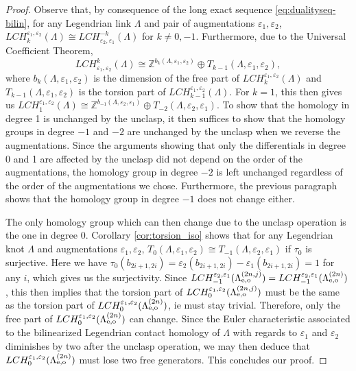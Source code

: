 \documentclass[11pt]{amsart}
\theoremstyle{plain}
\theoremstyle{remark}
\numberwithin{equation}{section}
\newcommand{\Z}{\ensuremath{\mathbb{Z}}}
\begin{document}
\begin{proof}
Observe that, by consequence of the long exact sequence \eqref{eq:dualityseq-bilin}, for any Legendrian link $\Lambda$ and pair of augmentations $\varepsilon_1,\varepsilon_2$, $LCH_k^{\varepsilon_1,\varepsilon_2}(\Lambda)\cong LCH^{-k}_{\varepsilon_2,\varepsilon_1}(\Lambda)$ for $k\neq0,-1$. Furthermore, due to the Universal Coefficient Theorem, $$LCH^{k}_{\varepsilon_1,\varepsilon_2}(\Lambda)\cong \Z^{b_k(\Lambda,\varepsilon_1,\varepsilon_2)}\oplus T_{k-1}(\Lambda,\varepsilon_1,\varepsilon_2),$$ where $b_k(\Lambda,\varepsilon_1,\varepsilon_2)$ is the dimension of the free part of $LCH_{k}^{\varepsilon_1,\varepsilon_2}(\Lambda)$ and $T_{k-1}(\Lambda,\varepsilon_1,\varepsilon_2)$ is the torsion part of $LCH_{k-1}^{\varepsilon_1,\varepsilon_2}(\Lambda)$. For $k=1$, this then gives us $LCH_{1}^{\varepsilon_1,\varepsilon_2}(\Lambda)\cong \Z^{b_{-1}(\Lambda,\varepsilon_2,\varepsilon_1)}\oplus T_{-2}(\Lambda,\varepsilon_2,\varepsilon_1)$. To show that the homology in degree 1 is unchanged by the unclasp, it then suffices to show that the homology groups in degree $-1$ and $-2$ are unchanged by the unclasp when we reverse the augmentations. Since the arguments showing that only the differentials in degree 0 and 1 are affected by the unclasp did not depend on the order of the augmentations, the homology group in degree $-2$ is left unchanged regardless of the order of the augmentations we chose. Furthermore, the previous paragraph shows that the homology group in degree $-1$ does not change either. 

The only homology group which can then change due to the unclasp operation is the one in degree 0. Corollary \ref{cor:torsion_iso} shows that for any Legendrian knot $\Lambda$ and augmentations $\varepsilon_1,\varepsilon_2$, $T_0(\Lambda,\varepsilon_1,\varepsilon_2)\cong T_{-1}(\Lambda,\varepsilon_2,\varepsilon_1)$ if $\tau_0$ is surjective. Here we have $\tau_0(b_{2i+1,2i})=\varepsilon_2(b_{2i+1,2i})-\varepsilon_1(b_{2i+1,2i})=1$ for any $i$, which gives us the surjectivity. Since $LCH^{\varepsilon_2,\varepsilon_1}_{-1}(\Lambda_{\rm e,o}^{(2n,j)})=LCH^{\varepsilon_2,\varepsilon_1}_{-1}(\Lambda_{\rm e,o}^{(2n)})$, this then implies that the torsion part of $LCH^{\varepsilon_1,\varepsilon_2}_{0}(\Lambda_{\rm e,o}^{(2n,j)})$ must be the same as the torsion part of $LCH^{\varepsilon_1,\varepsilon_2}_{0}(\Lambda_{\rm e,o}^{(2n)})$, ie must stay trivial. Therefore, only the free part of $LCH^{\varepsilon_1,\varepsilon_2}_{0}(\Lambda_{\rm e,o}^{(2n)})$ can change. Since the Euler characteristic associated to the bilinearized Legendrian contact homology of $\Lambda$ with regards to $\varepsilon_1$ and $\varepsilon_2$ diminishes by two after the unclasp operation, we may then deduce that $LCH^{\varepsilon_1,\varepsilon_2}_{0}(\Lambda_{\rm e,o}^{(2n)})$ must lose two free generators. This concludes our proof.\end{proof}
\end{document}
